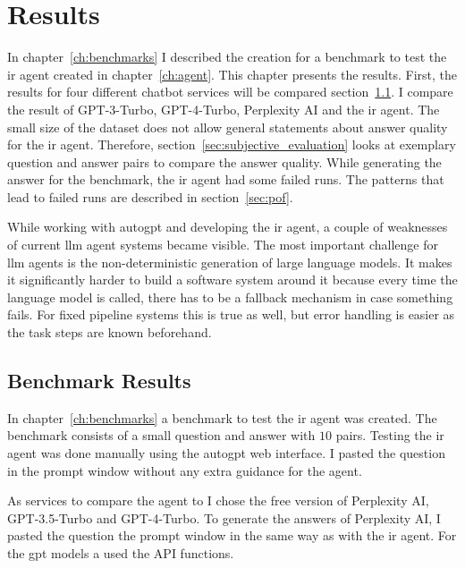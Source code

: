 \documentclass[../main.tex]{subfiles}
\begin{document}
\chapter{Results}
\label{ch:results}

In chapter~\ref{ch:benchmarks} I described the creation for a benchmark
to test the \gls{ir} agent created in chapter~\ref{ch:agent}.
This chapter presents the results.
First, the results for four different chatbot services will be compared
section~\ref{sec:benchmark_results}.
I compare the result of GPT-3-Turbo, GPT-4-Turbo, Perplexity AI and the \gls{ir}
agent.
The small size of the dataset does not allow general statements about
answer quality for the \gls{ir} agent.
Therefore, section~\ref{sec:subjective_evaluation} looks at exemplary question and answer
pairs to compare the answer quality.
While generating the answer for the benchmark, the \gls{ir} agent had some failed runs.
The patterns that lead to failed runs are described in section~\ref{sec:pof}.

While working with \gls{autogpt} and developing the \gls{ir} agent,
a couple of weaknesses of current \gls{llm} agent systems became visible.
The most important challenge for \gls{llm} agents is the non-deterministic generation of large language models.
It makes it significantly harder to build a software system around it because every time the language model is called,
there has to be a fallback mechanism in case something fails.
For fixed pipeline systems this is true as well,
but error handling is easier as the task steps are known beforehand.

\section{Benchmark Results}
\label{sec:benchmark_results}

In chapter~\ref{ch:benchmarks} a benchmark to test the \gls{ir} agent was created.
The benchmark consists of a small question and answer with $10$ pairs.
Testing the \gls{ir} agent was done manually using the \gls{autogpt} web interface.
I pasted the question in the prompt window without any extra guidance for the agent.

As services to compare the agent to I chose the free version of Perplexity AI,
GPT-3.5-Turbo and GPT-4-Turbo.
To generate the answers of Perplexity AI, I pasted the question the prompt window in the
same way as with the \gls{ir} agent.
For the \gls{gpt} models a used the API functions.
\end{document}
